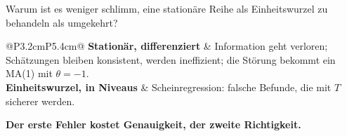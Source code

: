 \begin{aufgabe}
Warum ist es weniger schlimm, eine stationäre Reihe als Einheitswurzel zu behandeln als umgekehrt?

\loesung
{}
\begin{center}
{\small
\renewcommand{\arraystretch}{1.5}
\begin{tabular}{@{}P{3.2cm}P{5.4cm}@{}}
\toprule
\textbf{Stationär, differenziert} & Information geht verloren; Schätzungen bleiben konsistent, werden ineffizient; die Störung bekommt ein MA(1) mit $\theta = -1$.\\
\textbf{Einheitswurzel, in Niveaus} & Scheinregression: falsche Befunde, die mit $T$ sicherer werden.\\
\bottomrule
\end{tabular}}
\end{center}

\begin{center}
\begin{minipage}{0.9\textwidth}
\textbf{Der erste Fehler kostet Genauigkeit, der zweite Richtigkeit.}
\end{minipage}
\end{center}

\begin{center}
\begin{minipage}{0.88\textwidth}
\end{minipage}
\end{center}
\end{aufgabe}

